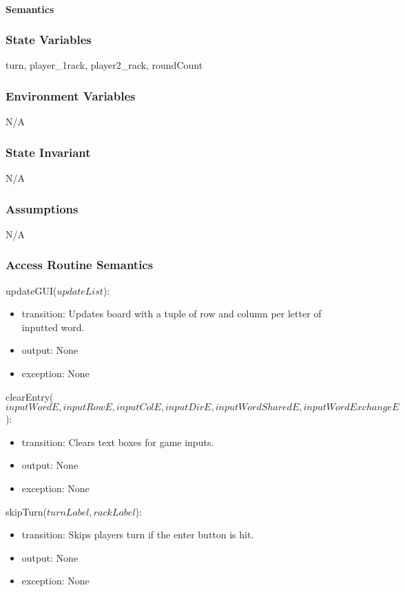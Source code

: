 \documentclass[12pt]{article}
\begin{document}
\paragraph* {Semantics}

\subsubsection*{State Variables}

turn, player\_1rack, player2\_rack, roundCount

\subsubsection*{Environment Variables}

N/A

\subsubsection*{State Invariant}

N/A

\subsubsection*{Assumptions}

N/A

\subsubsection* {Access Routine Semantics}

\noindent updateGUI($updateList$):
\begin{itemize}
\item transition: Updates board with a tuple of row and column per letter of inputted word.
\item output: None
\item exception: None
\end{itemize}

\noindent clearEntry($inputWordE, inputRowE, inputColE, inputDirE,inputWordSharedE, inputWordExchangeE$):
\begin{itemize}
\item transition: Clears text boxes for game inputs.
\item output: None
\item exception: None
\end{itemize}

\noindent skipTurn($turnLabel, rackLabel$):
\begin{itemize}
\item transition: Skips players turn if the enter button is hit.
\item output: None
\item exception: None
\end{itemize}
\end{document}

